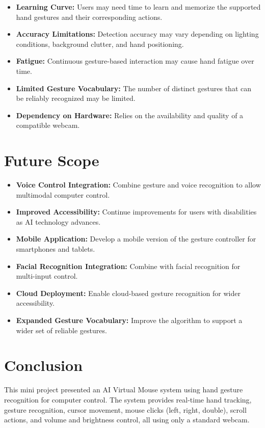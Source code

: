 \documentclass[12pt,a4paper]{report}
\begin{document}
\begin{itemize}[noitemsep]
  \item \textbf{Learning Curve:} Users may need time to learn and memorize the supported hand
    gestures and their corresponding actions.
  \item \textbf{Accuracy Limitations:} Detection accuracy may vary depending on lighting
    conditions, background clutter, and hand positioning.
  \item \textbf{Fatigue:} Continuous gesture-based interaction may cause hand fatigue over
    time.
  \item \textbf{Limited Gesture Vocabulary:} The number of distinct gestures that can be
    reliably recognized may be limited.
  \item \textbf{Dependency on Hardware:} Relies on the availability and quality of a
    compatible webcam.
\end{itemize}

\section{Future Scope}

\begin{itemize}[noitemsep]
  \item \textbf{Voice Control Integration:} Combine gesture and voice recognition to allow
    multimodal computer control.
  \item \textbf{Improved Accessibility:} Continue improvements for users with disabilities as
    AI technology advances.
  \item \textbf{Mobile Application:} Develop a mobile version of the gesture controller for
    smartphones and tablets.
  \item \textbf{Facial Recognition Integration:} Combine with facial recognition for
    multi-input control.
  \item \textbf{Cloud Deployment:} Enable cloud-based gesture recognition for wider
    accessibility.
  \item \textbf{Expanded Gesture Vocabulary:} Improve the algorithm to support a wider set of
    reliable gestures.
\end{itemize}

\section{Conclusion}

This mini project presented an AI Virtual Mouse system using hand gesture recognition for
computer control. The system provides real-time hand tracking, gesture recognition, cursor
movement, mouse clicks (left, right, double), scroll actions, and volume and brightness
control, all using only a standard webcam.
\end{document}
